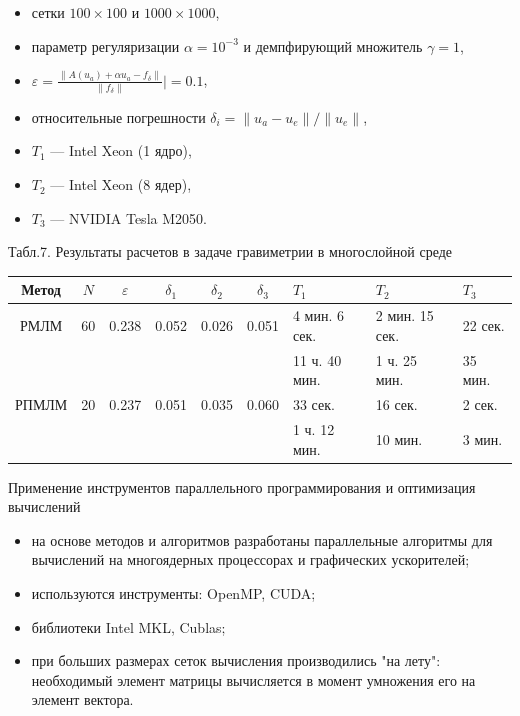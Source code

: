 \documentclass[10pt,pdf, mathserif, hyperref={unicode}]{beamer}
\begin{document}
\begin{frame}
	\begin{itemize}
		\item сетки $100\times100$ и $1000\times1000$,
		\item параметр регуляризации $\alpha=10^{-3}$ и демпфирующий множитель $\gamma=1$,
		\item $\varepsilon=\frac{\|A(u_a)+\alpha u_a-f_\delta\|}{\|f_\delta\|}|=0.1$,
		\item относительные погрешности $\delta_i=\|u_a-u_e\|/\|u_e\|$,
		\item $T_1$ --- Intel Xeon (1 ядро),
		\item $T_2$ --- Intel Xeon (8 ядер),
		\item $T_3$ --- NVIDIA Tesla M2050.
	\end{itemize}
	\begin{table} 
		\centering
		\renewcommand{\arraystretch}{1.5} 
		{\scriptsize Табл.7. Результаты расчетов в задаче гравиметрии в многослойной среде}
		\begin{tabular}{|c|c|c|c|c|c|p{}|p{}|p{}|}
			\hline
			Метод & $N$ & $\varepsilon$ & $\delta_1$ & $\delta_2$ & $\delta_3$ & $T_1$ & $T_2$ & $T_3$ \\ \hline \rule{0cm}{0.4cm}
			РМЛМ  & 60 & 0.238 & 0.052 & 0.026 & 0.051 &   4 мин. 6 сек.   &  2 мин. 15 сек.   &   22 сек.  \\ \cline{7-9} 
			&       &                   &                   &                   &                   &    11 ч. 40 мин.  &  1 ч. 25 мин.  &   35 мин.   \\ \hline \rule{0cm}{0.4cm}
			РПМЛМ & 20 & 0.237 & 0.051 & 0.035 & 0.060 &  33 сек.    &  16 сек.    &  2 сек.    \\ \cline{7-9} 
			&                   &                   &                   &                   &        &   1 ч. 12 мин.   &  10 мин.    &  3 мин.   \\ \hline
		\end{tabular}
	\end{table}
\end{frame}
\begin{frame}{Применение инструментов параллельного программирования и оптимизация вычислений}
	\begin{itemize}
		\item на основе методов и алгоритмов разработаны параллельные алгоритмы для вычислений на многоядерных процессорах и графических ускорителей;
		\item используются инструменты: OpenMP, CUDA;
		\item библиотеки Intel MKL, Cublas;
		\item при больших размерах сеток вычисления производились "на лету": необходимый элемент матрицы вычисляется в момент умножения его на элемент вектора.
	\end{itemize}
\end{frame}
\end{document}
